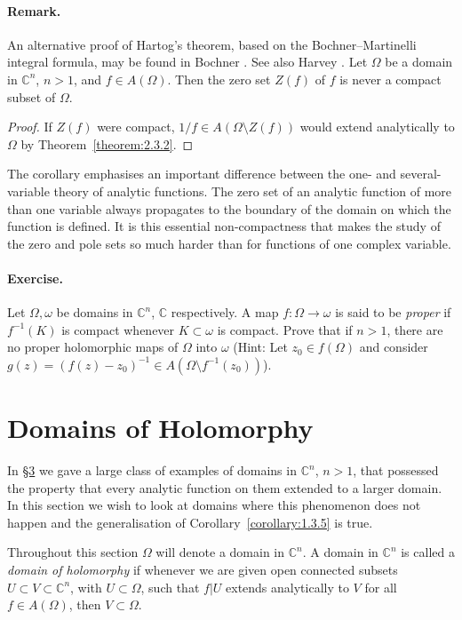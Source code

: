 \paragraph*{Remark.} An alternative proof of Hartog's theorem, based on the Bochner--Martinelli integral formula, may be found in Bochner \cite{bib:I:bochner-s:1}. See also Harvey \cite[page 355]{bib:I:harvey-f-r:2}.
 Let $\Omega$ be a domain in $\mathbb C^n$, $n>1$, and $f\in A(\Omega)$. Then the zero set $Z(f)$ of $f$ is never a compact subset of $\Omega$.
\begin{proof}
If $Z(f)$ were compact, $1/f\in A(\Omega\setminus Z(f))$ would extend analytically to $\Omega$ by Theorem~\ref{theorem:2.3.2}.
\end{proof}
The corollary emphasises an important difference between the one- and several-variable theory of analytic functions. The zero set of an analytic function of more than one variable always propagates to the boundary of the domain on which the function is defined. It is this essential non-compactness that makes the study of the zero and pole sets so much harder than for functions of one complex variable.
\paragraph*{Exercise.} Let $\Omega,\omega$ be domains in $\mathbb C^n$, $\mathbb C$ respectively. A map $f:\Omega\to\omega$ is said to be \emph{proper} if $f^{-1}(K)$ is compact whenever $K\subset\omega$ is compact. Prove that if $n>1$, there are no proper holomorphic maps of $\Omega$ into $\omega$ (Hint: Let $z_0\in f(\Omega)$ and consider $g(z)=(f(z)-z_0)^{-1}\in A(\Omega\setminus f^{-1}(z_0))$).

\section{Domains of Holomorphy}\label{sec:2:4}
In \hyperref[sec:2:3]{\S3} we gave a large class of examples of domains in $\mathbb C^n$, $n>1$, that possessed the property that every analytic function on them extended to a larger domain. In this section we wish to look at domains where this phenomenon does not happen and the generalisation of Corollary~\ref{corollary:1.3.5} is true.

Throughout this section $\Omega$ will denote a domain in $\mathbb C^n$.
 A domain in $\mathbb C^n$ is called a \emph{domain of holomorphy} if whenever we are given open connected subsets $U\subset V\subset\mathbb C^n$, with $U\subset\Omega$, such that $f|U$ extends analytically to $V$ for all $f\in A(\Omega)$, then $V\subset\Omega$.

